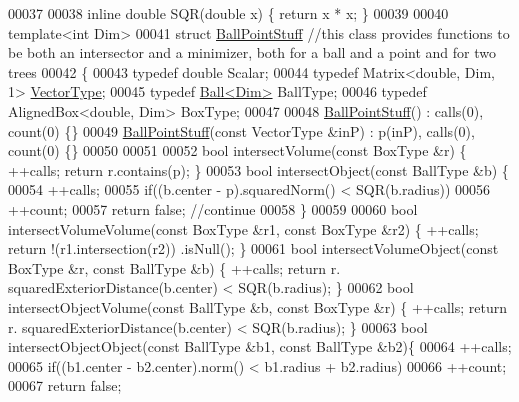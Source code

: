 \begin{DoxyCode}
00037 
00038 \textcolor{keyword}{inline} \textcolor{keywordtype}{double} SQR(\textcolor{keywordtype}{double} x) \{ \textcolor{keywordflow}{return} x * x; \}
00039 
00040 \textcolor{keyword}{template}<\textcolor{keywordtype}{int} Dim>
00041 \textcolor{keyword}{struct }\hyperlink{struct_ball_point_stuff}{BallPointStuff} \textcolor{comment}{//this class provides functions to be both an intersector and a
       minimizer, both for a ball and a point and for two trees}
00042 \{
00043   \textcolor{keyword}{typedef} \textcolor{keywordtype}{double} Scalar;
00044   \textcolor{keyword}{typedef} Matrix<double, Dim, 1> \hyperlink{struct_vector_type}{VectorType};
00045   \textcolor{keyword}{typedef} \hyperlink{struct_ball}{Ball<Dim>} BallType;
00046   \textcolor{keyword}{typedef} AlignedBox<double, Dim> BoxType;
00047 
00048   \hyperlink{struct_ball_point_stuff}{BallPointStuff}() : calls(0), count(0) \{\}
00049   \hyperlink{struct_ball_point_stuff}{BallPointStuff}(\textcolor{keyword}{const} VectorType &inP) : p(inP), calls(0), count(0) \{\}
00050 
00051 
00052   \textcolor{keywordtype}{bool} intersectVolume(\textcolor{keyword}{const} BoxType &r) \{ ++calls; \textcolor{keywordflow}{return} r.contains(p); \}
00053   \textcolor{keywordtype}{bool} intersectObject(\textcolor{keyword}{const} BallType &b) \{
00054     ++calls;
00055     \textcolor{keywordflow}{if}((b.center - p).squaredNorm() < SQR(b.radius))
00056       ++count;
00057     \textcolor{keywordflow}{return} \textcolor{keyword}{false}; \textcolor{comment}{//continue}
00058   \}
00059 
00060   \textcolor{keywordtype}{bool} intersectVolumeVolume(\textcolor{keyword}{const} BoxType &r1, \textcolor{keyword}{const} BoxType &r2) \{ ++calls; \textcolor{keywordflow}{return} !(r1.intersection(r2))
      .isNull(); \}
00061   \textcolor{keywordtype}{bool} intersectVolumeObject(\textcolor{keyword}{const} BoxType &r, \textcolor{keyword}{const} BallType &b) \{ ++calls; \textcolor{keywordflow}{return} r.
      squaredExteriorDistance(b.center) < SQR(b.radius); \}
00062   \textcolor{keywordtype}{bool} intersectObjectVolume(\textcolor{keyword}{const} BallType &b, \textcolor{keyword}{const} BoxType &r) \{ ++calls; \textcolor{keywordflow}{return} r.
      squaredExteriorDistance(b.center) < SQR(b.radius); \}
00063   \textcolor{keywordtype}{bool} intersectObjectObject(\textcolor{keyword}{const} BallType &b1, \textcolor{keyword}{const} BallType &b2)\{
00064     ++calls;
00065     \textcolor{keywordflow}{if}((b1.center - b2.center).norm() < b1.radius + b2.radius)
00066       ++count;
00067     \textcolor{keywordflow}{return} \textcolor{keyword}{false};

\end{DoxyCode}
